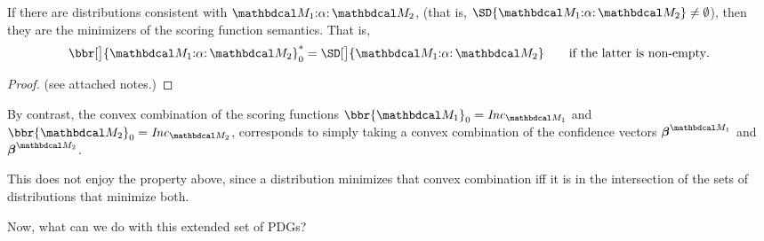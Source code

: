 \documentclass{article}
\begin{document}
\begin{prop}
    If there are distributions consistent with $\dg M_1 {:} \alpha {:}\, \dg M_2$, (that is, $\SD{\dg M_1 {:} \alpha {:}\, \dg M_2} \ne \emptyset$), then they are the minimizers of the scoring function semantics. That is,
    \[
        \bbr[\big]{\dg M_1 {:} \alpha {:}\, \dg M_2}_0^*
            = \SD[\big]{\dg M_1 {:} \alpha {:}\, \dg M_2}
        \qquad\text{if the latter is non-empty}.
    \]
\end{prop}
\begin{proof}
    (see attached notes.)
\end{proof}    

By contrast, the convex combination of the scoring functions $\bbr{\dg M_1}_0 = \Inc_{\dg M_1}$ and $\bbr{\dg M_2}_0 = \Inc_{\dg M_2}$, corresponds to simply taking a convex combination of the confidence vectors $\bbeta^{\dg M_1}$ and $\bbeta^{\dg M_2}$.

This does not enjoy the property above, since a distribution minimizes that convex combination iff it is in the intersection of the sets of distributions that minimize both. 

\bigskip

Now, what can we do with this extended set of PDGs? 
\end{document}
